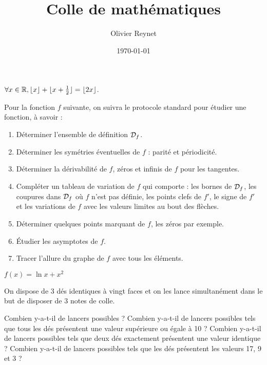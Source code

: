 \documentclass[french,12pt,a4paper]{article}
\author{Olivier Reynet}
\title{Colle de mathématiques}
\date{\today}
\begin{document}
\maketitle


\begin{exercise}[subtitle= Partie entière]
		 \Mq $\forall x \in \mathbb{R}, \lfloor x \rfloor + \lfloor x + \frac{1}{2} \rfloor = \lfloor 2 x \rfloor$.
\end{exercise}


\begin{exercise}[subtitle= Étude d'une fonction]
	Pour la fonction $f$ suivante, on suivra le protocole standard pour étudier une fonction, à savoir :
	\begin{enumerate}
		\item Déterminer l'ensemble de définition $\mathcal{D}_f$.
		\item Déterminer les symétries éventuelles de $f$ : parité et périodicité.
		\item Déterminer la dérivabilité de $f$,  zéros et infinis de $f$ pour les tangentes.
		\item Compléter un tableau de variation de $f$ qui comporte : les bornes de $\mathcal{D}_f$, les coupures dans $\mathcal{D}_f$ où $f$ n'est pas définie, les points clefs de $f'$, le signe de $f'$ et les variations de $f$ avec les valeurs limites au bout des flèches.
		\item Déterminer quelques points marquant de $f$, les zéros par exemple.
		\item Étudier les asymptotes de $f$.
		\item Tracer l'allure du graphe de $f$ avec tous les éléments.
	\end{enumerate}

	$f(x)= \ln{x}+x^2$

\end{exercise}

	\begin{exercise}[subtitle= Dé à 20 faces]
		On dispose de 3 dés identiques à vingt faces et on les lance simultanément dans le but de disposer de 3 notes de colle. 
		\begin{tasks}
			\task Combien y-a-t-il de lancers possibles ?
			\task Combien y-a-t-il de lancers possibles tels que tous les dés présentent une valeur supérieure ou égale à 10 ?
			\task Combien y-a-t-il de lancers possibles tels que deux dés exactement présentent une valeur identique ? 
			\task Combien y-a-t-il de lancers possibles tels que les dés présentent  les valeurs 17, 9 et 3 ?
		\end{tasks}
	\end{exercise}
\end{document}
